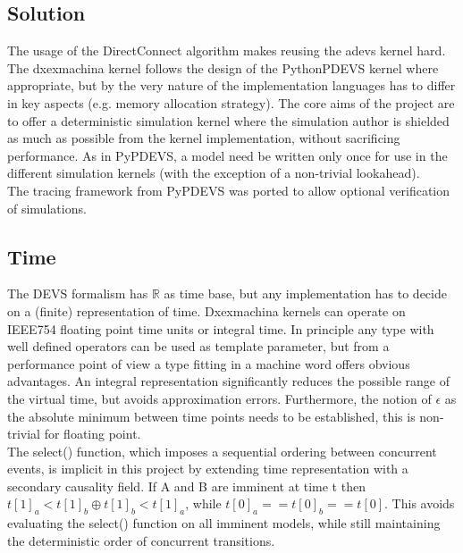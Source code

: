 \subsection{Solution} %
The usage of the DirectConnect\cite{SymbolicFlattening} algorithm makes reusing the adevs kernel hard.
The dxexmachina kernel follows the design of the PythonPDEVS \cite{PythonPDEVS} kernel where appropriate, but by the very nature of the implementation languages has to differ in key aspects (e.g. memory allocation strategy). 
The core aims of the project are to offer a deterministic simulation kernel where the simulation author is shielded as much as possible from the kernel implementation, without sacrificing performance. As in PyPDEVS, a model need be written only once for use in the different simulation kernels (with the exception of a non-trivial lookahead).\\
The tracing framework from PyPDEVS was ported to allow optional verification of simulations. 
\subsection{Time}
The DEVS formalism has $\mathbb{R}$ as time base, but any implementation has to decide on a (finite) representation of time. Dxexmachina kernels can operate on IEEE754 floating point time units or integral time. In principle any type with well defined operators can be used as template parameter, but from a performance point of view a type fitting in a machine word offers obvious advantages.%
An integral representation significantly reduces the possible range of the virtual time, but avoids approximation errors. Furthermore, the notion of $\epsilon$ as the absolute minimum between time points needs to be established, this is non-trivial for floating point.\\
The select() function, which imposes a sequential ordering between concurrent events, is implicit in this project by extending time representation with a secondary causality field. If A and B are imminent at time t then $t[1]_a < t[1]_b \oplus t[1]_b < t[1]_a$, while $t[0]_a == t[0]_b == t[0]$. This avoids evaluating the select() function on all imminent models, while still maintaining the deterministic order of concurrent transitions.
